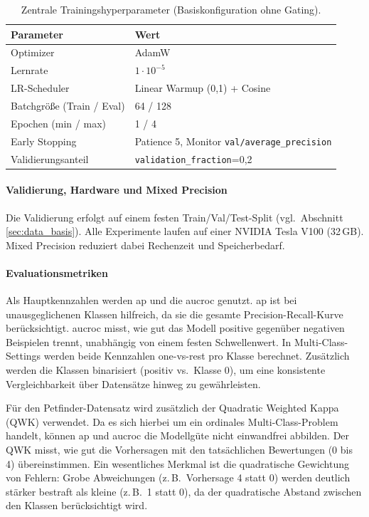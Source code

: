 \begin{table}[H]
    \centering
    \small
    \caption{Zentrale Trainingshyperparameter (Basiskonfiguration ohne Gating).}
    \label{tab:training_hparams}
    \begin{tabular}{@{}ll@{}}
        \hline
        \textbf{Parameter} & \textbf{Wert} \\
        \hline
        Optimizer & AdamW \\
        Lernrate & $1\cdot 10^{-5}$ \\
        LR-Scheduler & Linear Warmup (0{,}1) + Cosine \\
        Batchgröße (Train / Eval) & 64 / 128 \\
        Epochen (min / max) & 1 / 4 \\
        Early Stopping & Patience 5, Monitor \texttt{val/average\_\allowbreak precision} \\
        Validierungsanteil & \texttt{validation\_\allowbreak fraction}=0{,}2 \\
        \hline
\end{tabular}
\end{table}

\paragraph{Validierung, Hardware und Mixed Precision}
Die Validierung erfolgt auf einem festen Train/Val/Test-Split (vgl.\ Abschnitt \ref{sec:data_basis}). Alle Experimente laufen auf einer NVIDIA Tesla V100 (32\,GB). Mixed Precision reduziert dabei Rechenzeit und Speicherbedarf.

\paragraph{Evaluationsmetriken}
Als Hauptkennzahlen werden \Gls{ap} und die \Gls{aucroc} genutzt. \Gls{ap} ist bei unausgeglichenen Klassen hilfreich, da sie die gesamte Precision-Recall-Kurve berücksichtigt. \Gls{aucroc} misst, wie gut das Modell positive gegenüber negativen Beispielen trennt, unabhängig von einem festen Schwellenwert. In Multi-Class-Settings werden beide Kennzahlen one-vs-rest pro Klasse berechnet. Zusätzlich werden die Klassen binarisiert (positiv vs.\ Klasse 0), um eine konsistente Vergleichbarkeit über Datensätze hinweg zu gewährleisten. 

Für den Petfinder-Datensatz wird zusätzlich der Quadratic Weighted Kappa (QWK) verwendet. Da es sich hierbei um ein ordinales Multi-Class-Problem handelt, können \Gls{ap} und \Gls{aucroc} die Modellgüte nicht einwandfrei abbilden. Der QWK misst, wie gut die Vorhersagen mit den tatsächlichen Bewertungen (0 bis 4) übereinstimmen. Ein wesentliches Merkmal ist die quadratische Gewichtung von Fehlern: Grobe Abweichungen (z.\,B.\ Vorhersage 4 statt 0) werden deutlich stärker bestraft als kleine (z.\,B.\ 1 statt 0), da der quadratische Abstand zwischen den Klassen berücksichtigt wird.

